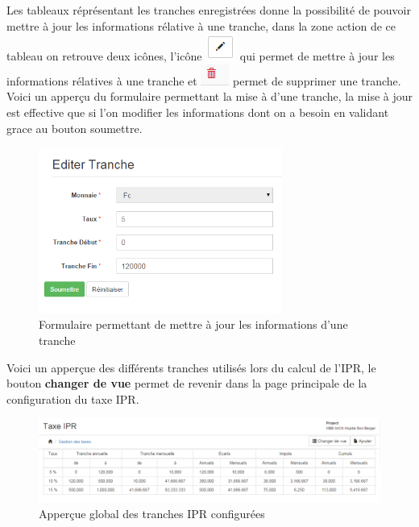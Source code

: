 \documentclass[12pt,a4paper]{report}
\begin{document}
Les tableaux réprésentant les tranches enregistrées donne la possibilité de pouvoir mettre à jour les informations rélative à une tranche, dans la zone action de ce tableau on retrouve deux icônes, l'icône \includegraphics[scale=0.7]{pic/EditBlack.png} qui permet de mettre à jour les informations rélatives à une tranche et \includegraphics[scale=0.7]{pic/DeleteWRed.png} permet de supprimer une tranche.
Voici un apperçu du formulaire permettant la mise à d'une tranche, la mise à jour est effective que si l'on modifier les informations dont on a besoin en validant grace au bouton soumettre. 

\begin{figure}[h]
\begin{center}
\includegraphics[width=8cm]{pic/EditTranche.png}
\end{center}
\caption{Formulaire permettant de mettre à jour les informations d'une tranche}
\label{Formulaire permettant de mettre à jour les informations d'une tranche}
\end{figure}

Voici un apperçue des différents tranches utilisés lors du calcul de l'IPR, le bouton \textbf{changer de vue} permet de revenir dans la page principale de la configuration du taxe IPR.

\begin{figure}[h]
\begin{center}
\includegraphics[width=15cm]{pic/ConfigTaxes.png}
\end{center}
\caption{Apperçue global des tranches IPR configurées}
\label{Apperçue global des tranches IPR configurées}
\end{figure}
\newpage
\end{document}

